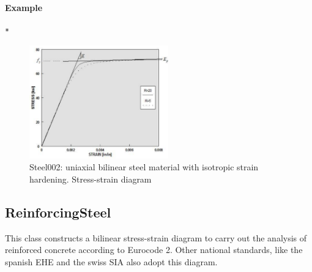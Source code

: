 \paragraph{Example}
\begin{verbatim}
*
\end{verbatim}

\begin{figure}[h]
\centering
\includegraphics[width=60mm]{materials/figures/Steel02Monotonic}
\caption{Steel002: uniaxial bilinear steel material with isotropic strain hardening. Stress-strain diagram}\label{Steel02}
\end{figure}

\subsection{ReinforcingSteel}
\noindent This class constructs a bilinear stress-strain diagram to carry out the analysis of reinforced concrete according to Eurocode 2. Other national standards, like the spanish EHE and the swiss SIA also adopt this diagram.

